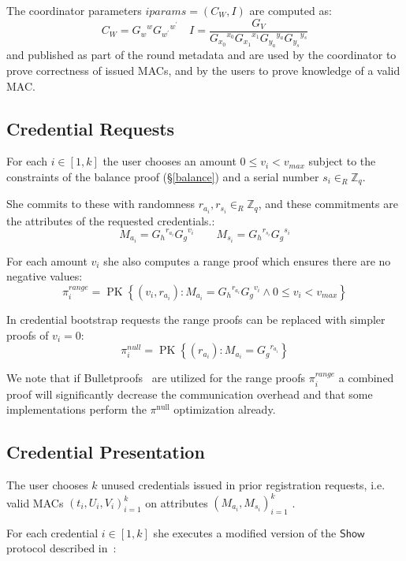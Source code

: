\documentclass{article}
\begin{document}
The coordinator parameters
$\mathit{iparams} =  (C_{W}, I)$
are computed as:
\[
C_{W}={G_w}^{w} {G_{w^\prime}}^{w^\prime}
\quad
I=\frac{G_{V}}{{G_{x_0}}^{x_0} {G_{x_1}}^{x_1} {G_{y_a}}^{y_a} {G_{y_s}}^{y_s}}
\]
and published as part of the round metadata and are used by the coordinator to prove correctness of issued MACs, and by the users to prove knowledge of a valid MAC.

\subsection{Credential Requests}

For each $i \in [1, k]$ the user chooses an amount $0 \leq v_i < v_{\mathit{max}}$ subject to the constraints of the balance proof (\S\ref{balance}) and a serial number $s_i \in_R \mathbb{Z}_q$.

She commits to these with randomness $r_{a_i}, r_{s_i} \in_R \mathbb{Z}_q$, and these commitments are the attributes of the requested credentials.:
\[ M_{a_i}={G_h}^{r_{a_i}}{G_g}^{v_i} \qquad M_{s_i}={G_h}^{r_{s_i}}{G_g}^{s_i} \]

For each amount $v_i$ she also computes a range proof which ensures there are no negative values:
\[
\pi^{\mathit{range}}_i = \operatorname{PK}\left\{\left(v_i, r_{a_i} \right) :
M_{a_i} = {G_h}^{r_{a_i}}{G_g}^{v_i}
\land
0 \leq v_i < v_{\mathit{max}} \right\}
\]

In credential bootstrap requests the range proofs can be replaced with simpler proofs of $v_i = 0$:
\[
  \pi^{\mathit{null}}_i = \operatorname{PK}\left\{ \left( r_{a_i}\right) :
    M_{a_i} = {G_{g}}^{r_{a_i}}
  \right\}
\]

We note that if Bulletproofs~\cite{bunz2018bulletproofs} are utilized for the range proofs $\pi^{\textit{range}}_i$ a combined proof will significantly decrease the communication overhead and that some implementations perform the $\pi^{\mathrm{null}}$ optimization already.

\subsection{Credential Presentation}

The user chooses $k$ unused credentials issued in prior registration requests, i.e. valid MACs $(t_i,U_i,V_i)_{i=1}^k$ on attributes $(M_{a_i}, M_{s_i})_{i=1}^k$ .

For each credential $i \in [1, k]$ she executes a modified version of the $\mathsf{Show}$ protocol described in~\cite{chase2019signal}:
\end{document}
